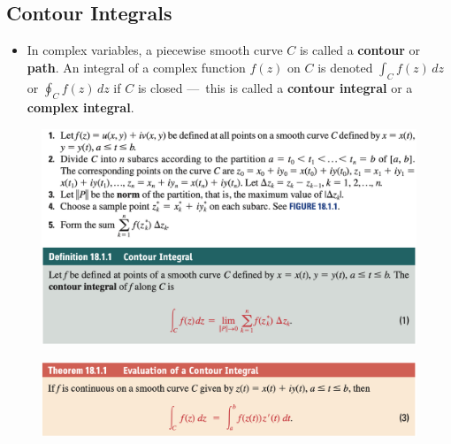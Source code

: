 \documentclass{article}
\begin{document}
\subsection{Contour Integrals}

\begin{itemize}
  \item In complex variables, a piecewise smooth curve $C$ is called a \textbf{contour} or \textbf{path}. An integral of a complex function $f(z)$ on $C$ is denoted $\int_C f(z) \,d z$ or $\oint_C f(z) \,d z$ if $C$ is closed — this is called a \textbf{contour integral} or a \textbf{complex integral}.
\end{itemize}

\begin{figure}[H]
  \centering
  \includegraphics[width=\textwidth]{contour-integral}
\end{figure}

\begin{figure}[H]
  \centering
  \includegraphics[width=\textwidth]{contour-integral-evaluation}
\end{figure}
\end{document}
